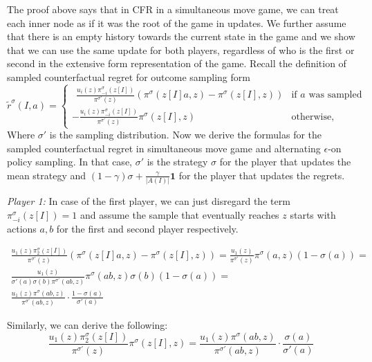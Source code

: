 \documentclass[preprint,12pt]{elsarticle}
\begin{document}
The proof above says that in CFR in a simultaneous move game, we can treat each inner node as if it was the root of the game in updates. We further assume that there is an empty history towards the current state in the game and we show that we can use the same update for both players, regardless of who is the first or second in the extensive form representation of the game. Recall the definition of sampled counterfactual regret for outcome sampling form \cite{Lanctot}
\begin{equation}
\tilde{r}^{\sigma}(I,a)=\left\{
\begin{array}{ll}
~~\frac{u_i(z)\pi^{\sigma}_{-i}(z[I])}{\pi^{\sigma'}(z)}(\pi^{\sigma}(z[I]a,z)-\pi^{\sigma}(z[I],z))& \mbox{if $a$ was sampled}\\ 
-\frac{u_i(z)\pi^{\sigma}_{-i}(z[I])}{\pi^{\sigma'}(z)} \pi^{\sigma}(z[I],z)& \mbox{otherwise,}
\end{array} \right.
\end{equation}
Where $\sigma'$ is the sampling distribution. Now we derive the formulas for the sampled counterfactual regret in simultaneous move game and alternating $\epsilon$-on policy sampling. In that case, $\sigma'$ is the strategy $\sigma$ for the player that updates the mean strategy and $(1-\gamma)\sigma + \frac{\gamma}{|A(I)|}\mathbf{1}$ for the player that updates the regrets.


\emph{Player 1:} In case of the first player, we can just disregard the term $\pi^{\sigma}_{-i}(z[I])=1$ and assume the sample that eventually reaches $z$ starts with actions $a,b$ for the first and second player respectively.

\begin{multline}
\frac{u_1(z)\pi^{\sigma}_{2}(z[I])}{\pi^{\sigma'}(z)}(\pi^{\sigma}(z[I]a,z)-\pi^{\sigma}(z[I],z)) = 
\frac{u_1(z)}{\pi^{\sigma'}(z)}\pi^{\sigma}(a,z)(1-\sigma(a))=\\
\frac{u_1(z)}{\sigma'(a)\sigma(b)\pi^{\sigma'}(ab,z)}\pi^{\sigma}(ab,z)\sigma(b)(1-\sigma(a))=\\
\frac{u_1(z)\pi^{\sigma}(ab,z)}{\pi^{\sigma'}(ab,z)}\cdot\frac{1-\sigma(a)}{\sigma'(a)}
\end{multline}

Similarly, we can derive the following:
\begin{equation}
\frac{u_1(z)\pi^{\sigma}_{2}(z[I])}{\pi^{\sigma'}(z)} \pi^{\sigma}(z[I],z)=
\frac{u_1(z)\pi^{\sigma}(ab,z)}{\pi^{\sigma'}(ab,z)} \cdot\frac{\sigma(a)}{\sigma'(a)}
\end{equation}
\end{document}
